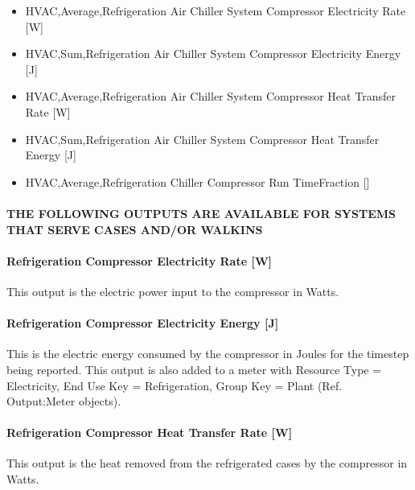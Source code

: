 \begin{itemize}
\item
  HVAC,Average,Refrigeration Air Chiller System Compressor Electricity Rate {[}W{]}
\item
  HVAC,Sum,Refrigeration Air Chiller System Compressor Electricity Energy {[}J{]}
\item
  HVAC,Average,Refrigeration Air Chiller System Compressor Heat Transfer Rate {[}W{]}
\item
  HVAC,Sum,Refrigeration Air Chiller System Compressor Heat Transfer Energy {[}J{]}
\item
  HVAC,Average,Refrigeration Chiller Compressor Run TimeFraction {[]}
\end{itemize}

\paragraph{THE FOLLOWING OUTPUTS ARE AVAILABLE FOR SYSTEMS THAT SERVE CASES AND/OR WALKINS}\label{the-following-outputs-are-available-for-systems-that-serve-cases-andor-walkins-1}

\paragraph{Refrigeration Compressor Electricity Rate {[}W{]}}\label{refrigeration-compressor-electric-power-w}

This output is the electric power input to the compressor in Watts.

\paragraph{Refrigeration Compressor Electricity Energy {[}J{]}}\label{refrigeration-compressor-electric-energy-j}

This is the electric energy consumed by the compressor in Joules for the timestep being reported. This output is also added to a meter with Resource Type = Electricity, End Use Key = Refrigeration, Group Key = Plant (Ref. Output:Meter objects).

\paragraph{Refrigeration Compressor Heat Transfer Rate {[}W{]}}\label{refrigeration-compressor-heat-transfer-rate-w}

This output is the heat removed from the refrigerated cases by the compressor in Watts.

